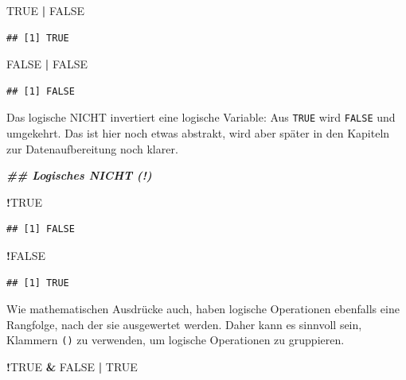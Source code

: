\documentclass[
  ngerman,
]{book}
\newenvironment{Shaded}{\begin{snugshade}}{\end{snugshade}}
\newcommand{\ConstantTok}[1]{\textcolor[rgb]{0.56,0.35,0.01}{#1}}
\newcommand{\DocumentationTok}[1]{\textcolor[rgb]{0.56,0.35,0.01}{\textbf{\textit{#1}}}}
\newcommand{\SpecialCharTok}[1]{\textcolor[rgb]{0.81,0.36,0.00}{\textbf{#1}}}
\begin{document}
\begin{Shaded}
\begin{Highlighting}[]
\ConstantTok{TRUE} \SpecialCharTok{|} \ConstantTok{FALSE}
\end{Highlighting}
\end{Shaded}

\begin{verbatim}
## [1] TRUE
\end{verbatim}

\begin{Shaded}
\begin{Highlighting}[]
\ConstantTok{FALSE} \SpecialCharTok{|} \ConstantTok{FALSE}
\end{Highlighting}
\end{Shaded}

\begin{verbatim}
## [1] FALSE
\end{verbatim}

Das logische NICHT invertiert eine logische Variable: Aus \texttt{TRUE} wird \texttt{FALSE} und umgekehrt. Das ist hier noch etwas abstrakt, wird aber später in den Kapiteln zur Datenaufbereitung noch klarer.

\begin{Shaded}
\begin{Highlighting}[]
\DocumentationTok{\#\# Logisches NICHT (!)}

\SpecialCharTok{!}\ConstantTok{TRUE}
\end{Highlighting}
\end{Shaded}

\begin{verbatim}
## [1] FALSE
\end{verbatim}

\begin{Shaded}
\begin{Highlighting}[]
\SpecialCharTok{!}\ConstantTok{FALSE}
\end{Highlighting}
\end{Shaded}

\begin{verbatim}
## [1] TRUE
\end{verbatim}

Wie mathematischen Ausdrücke auch, haben logische Operationen ebenfalls eine Rangfolge, nach der sie ausgewertet werden. Daher kann es sinnvoll sein, Klammern \texttt{()} zu verwenden, um logische Operationen zu gruppieren.

\begin{Shaded}
\begin{Highlighting}[]
\SpecialCharTok{!}\ConstantTok{TRUE} \SpecialCharTok{\&} \ConstantTok{FALSE} \SpecialCharTok{|} \ConstantTok{TRUE}
\end{Highlighting}
\end{Shaded}
\end{document}
